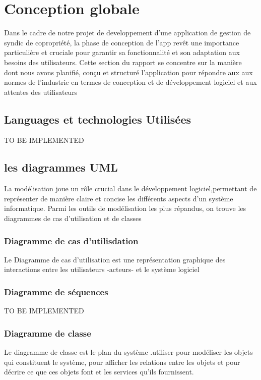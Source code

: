 
\section{Conception globale}
Dans le cadre de notre projet de developpement  d'une application de gestion de syndic de copropriété, la phase de conception de l'app revêt une importance particulière et cruciale pour garantir sa fonctionnalité et son adaptation aux besoins des utilisateurs. 
Cette section du rapport se concentre sur la manière dont nous avons planifié, conçu et structuré l'application pour répondre aux aux normes de l'industrie en termes de conception et de développement logiciel et aux attentes des utilisateurs

\subsection{Languages et technologies Utilisées}
TO BE IMPLEMENTED
\

\subsection{les diagrammes UML}
La modélisation  joue un rôle crucial  dans le développement logiciel,permettant de représenter de manière claire et concise les différents aspects d'un système informatique. 
Parmi les outils de modélisation les plus répandus, on trouve les diagrammes de cas d'utilisation et de classes

\subsubsection{Diagramme de cas d'utilisdation}
Le  Diagramme de cas d'utilisation est une représentation graphique des interactions entre les utilisateurs -acteurs- et le système logiciel



\subsubsection{Diagramme de séquences}
TO BE IMPLEMENTED
\subsubsection{Diagramme de classe}
Le diagramme de classe est le plan du système .utiliser pour modéliser les objets qui constituent le système, pour afficher les relations entre les objets et pour décrire ce que ces objets font et les services qu'ils fournissent.
\cite{IBM:class}